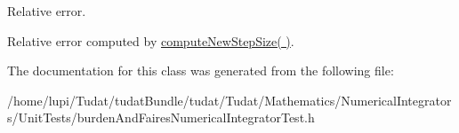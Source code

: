 Relative error. 

Relative error computed by \hyperlink{classtudat_1_1unit__tests_1_1BurdenAndFairesNumericalIntegratorTest_a798b53f6d7ede7fb9aa068107d4d0c4d}{compute\+New\+Step\+Size( )}. 

The documentation for this class was generated from the following file\+:\begin{DoxyCompactItemize}
\item 
/home/lupi/\+Tudat/tudat\+Bundle/tudat/\+Tudat/\+Mathematics/\+Numerical\+Integrators/\+Unit\+Tests/burden\+And\+Faires\+Numerical\+Integrator\+Test.\+h\end{DoxyCompactItemize}
